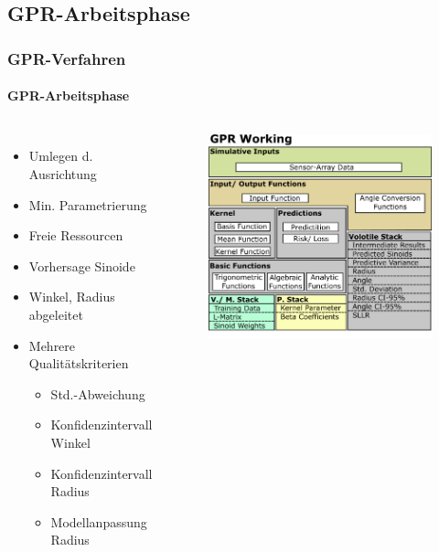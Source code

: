 \documentclass{beamer}
\begin{document}
\subsection{GPR-Arbeitsphase}
\begin{frame}
\frametitle{GPR-Verfahren}
\framesubtitle{GPR-Arbeitsphase}
\begin{columns}[c]
	\begin{itemize}
		\item<2-> Umlegen d. Ausrichtung
		\item<3-> Min. Parametrierung
		\item<4-> Freie Ressourcen
		\item<5-> Vorhersage Sinoide
		\item<6-> Winkel, Radius abgeleitet
		\item<7-> Mehrere Qualitätskriterien
		\begin{itemize}
			\item<7-> Std.-Abweichung
			\item<8-> Konfidenzintervall Winkel
			\item<8-> Konfidenzintervall Radius
			\item<9-> Modellanpassung Radius
		\end{itemize}
	\end{itemize}
	\begin{figure}
		\includegraphics[width=\linewidth]{images/Blockschema_Workphase}
	\end{figure}
\end{columns}
\end{frame}
\end{document}
